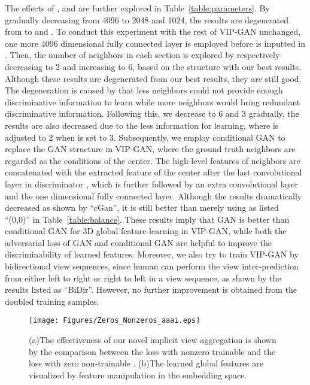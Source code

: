 \documentclass[letterpaper]{article} \usepackage{aaai19}  \usepackage{times}  \usepackage{helvet}  \usepackage{courier}  \usepackage{url}  \usepackage{graphicx}
\begin{document}
The effects of ,  and  are further explored in Table~\ref{table:parameters}. By gradually decreasing  from 4096 to 2048 and 1024, the results are degenerated from  to  and . To conduct this experiment with the rest of VIP-GAN unchanged, one more 4096 dimensional fully connected layer is employed before  is inputted in . Then, the number  of neighbors in each section  is explored by respectively decreasing  to 2 and increasing  to 6, based on the  structure with our best results. Although these results are degenerated from our best results, they are still good. The degeneration is caused by that less neighbors could not provide enough discriminative information to learn while more neighbors would bring redundant discriminative information. Following this, we decrease  to 6 and 3 gradually, the results are also decreased due to the less information for learning, where  is adjusted to 2 when  is set to 3. Subsequently, we employ conditional GAN to replace the GAN structure in VIP-GAN, where the ground truth neighbors are regarded as the conditions of the center. The high-level features  of neighbors are concatenated with the extracted feature of the center after the last convolutional layer in discriminator , which is further followed by an extra convolutional layer and the one dimensional fully connected layer. Although the results dramatically decreased as shown by ``cGan'', it is still better than merely using  as listed ``(0,0)'' in Table~\ref{table:balance}. These results imply that GAN is better than conditional GAN for 3D global feature learning in VIP-GAN, while both the adversarial loss of GAN and conditional GAN are helpful to improve the discriminability of learned features. Moreover, we also try to train VIP-GAN by bidirectional view sequences, since human can perform the view inter-prediction from either left to right or right to left in a view sequence, as shown by the results listed as ``BiDir''. However, no further improvement is obtained from the doubled training samples.




\begin{figure}[hb]
  \centering
\texttt{[image: Figures/Zeros\_Nonzeros\_aaai.eps]}
\caption{\label{fig:zeros} (a)The effectiveness of our novel implicit view aggregation is shown by the comparison between the loss with nonzero trainable  and the loss with zero non-trainable . (b)The learned global features are visualized by feature manipulation in the embedding space.}
\end{figure}
\end{document}
